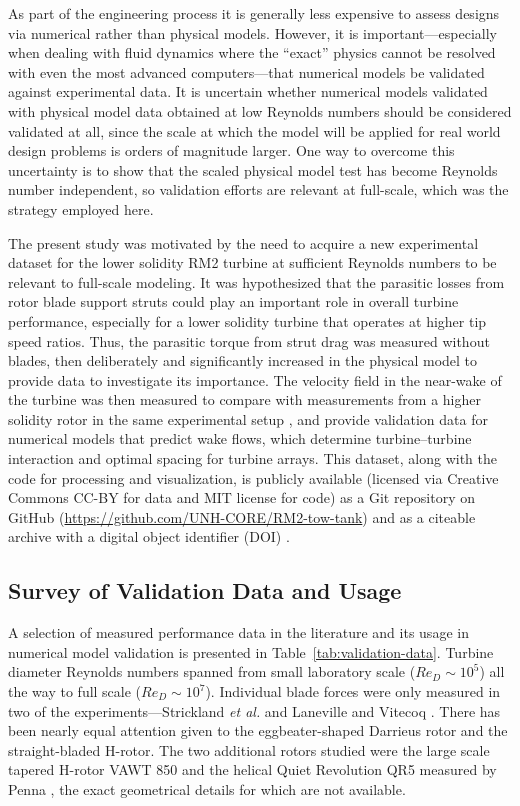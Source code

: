 \documentclass[10pt,letterpaper]{article}
\begin{document}
As part of the engineering process it is generally less expensive to assess
designs via numerical rather than physical models. However, it is
important---especially when dealing with fluid dynamics where the ``exact''
physics cannot be resolved with even the most advanced computers---that
numerical models be validated against experimental data. It is uncertain whether
numerical models validated with physical model data obtained at low Reynolds
numbers should be considered validated at all, since the scale at which the
model will be applied for real world design problems is orders of magnitude
larger. One way to overcome this uncertainty is to show that the scaled physical
model test has become Reynolds number independent, so validation efforts are
relevant at full-scale, which was the strategy employed here.

The present study was motivated by the need to acquire a new experimental
dataset for the lower solidity RM2 turbine at sufficient Reynolds numbers to be
relevant to full-scale modeling. It was hypothesized that the parasitic losses
from rotor blade support struts could play an important role in overall turbine
performance, especially for a lower solidity turbine that operates at higher tip
speed ratios. Thus, the parasitic torque from strut drag was measured without
blades, then deliberately and significantly increased in the physical model to
provide data to investigate its importance. The velocity field in the near-wake
of the turbine was then measured to compare with measurements from a higher
solidity rotor in the same experimental setup \cite{Bachant2015-JoT}, and
provide validation data for numerical models that predict wake flows, which
determine turbine--turbine interaction and optimal spacing for turbine arrays.
This dataset, along with the code for processing and visualization, is publicly
available (licensed via Creative Commons CC-BY for data and MIT license for
code) as a Git repository on GitHub
(\url{https://github.com/UNH-CORE/RM2-tow-tank}) and as a citeable archive with
a digital object identifier (DOI) \cite{Bachant2015-RM2-data}.


\subsection*{Survey of Validation Data and Usage}

A selection of measured performance data in the literature and its usage in
numerical model validation is presented in Table~\ref{tab:validation-data}.
Turbine diameter Reynolds numbers spanned from small laboratory scale ($Re_D
\sim 10^5$) all the way to full scale ($Re_D \sim 10^7$). Individual blade
forces were only measured in two of the experiments---Strickland \emph{et al.}
\cite{Strickland1981} and Laneville and Vitecoq \cite{Laneville1986}. There has
been nearly equal attention given to the eggbeater-shaped Darrieus rotor and the
straight-bladed H-rotor. The two additional rotors studied were the large scale
tapered H-rotor VAWT 850 \cite{Mays1990} and the helical Quiet Revolution QR5
measured by Penna \cite{Penna2008}, the exact geometrical details for which are
not available.
\end{document}
